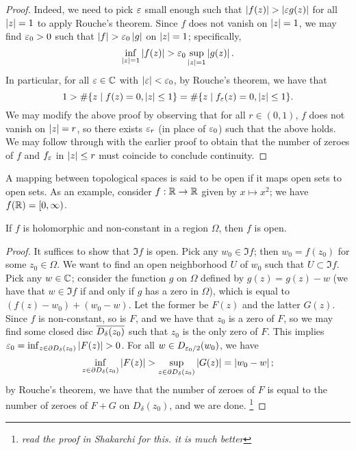 \begin{proof}
    Indeed, we need to pick $\varepsilon$ small enough such that $\left\lvert f(z) \right\rvert > \left\lvert \varepsilon g(z) \right\rvert$ for all $\left\lvert z \right\rvert = 1$ to apply Rouche's theorem. Since $f$ does not vanish on $\left\lvert z \right\rvert = 1$, we may find $\varepsilon_0 > 0$ such that $\left\lvert f \right\rvert > \varepsilon_0 \left\lvert g \right\rvert$ on $\left\lvert z \right\rvert = 1$; specifically,
    \[ \inf_{\left\lvert z \right\rvert = 1} \left\lvert f(z) \right\rvert > \varepsilon_0 \sup_{\left\lvert z \right\rvert = 1} \left\lvert g(z) \right\rvert. \]
    In particular, for all $\varepsilon \in \mathbb C$ with $\left\lvert \varepsilon \right\rvert < \varepsilon_0$, by Rouche's theorem, we have that 
    \[ 1 > \#\{z \mid f(z) = 0, \left\lvert z \right\rvert \leq 1\} = \#\{z \mid f_\varepsilon(z) = 0, \left\lvert z \right\rvert \leq 1\}. \]
    We may modify the above proof by observing that for all $r \in (0, 1)$, $f$ does not vanish on $\left\lvert z \right\rvert = r$, so there exists $\varepsilon_r$ (in place of $\varepsilon_0$) such that the above holds. We may follow through with the earlier proof to obtain that the number of zeroes of $f$ and $f_\varepsilon$ in $\left\lvert z \right\rvert \leq r$ must coincide to conclude continuity.
\end{proof}
\newpage
\noindent A mapping between topological spaces is said to be open if it maps open sets to open sets. As an example, consider $f : \mathbb R \to \mathbb R$ given by $x \mapsto x^2$; we have $f(\mathbb R) = [0, \infty)$.
\begin{theorem}
    If $f$ is holomorphic and non-constant in a region $\Omega$, then $f$ is open.
\end{theorem}
\begin{proof}
    It suffices to show that $\Im f$ is open. Pick any $w_0 \in \Im f$; then $w_0 = f(z_0)$ for some $z_0 \in \Omega$. We want to find an open neighborhood $U$ of $w_0$ such that $U \subset \Im f$. Pick any $w \in \mathbb C$; consider the function $g$ on $\Omega$ defined by $g(z) = g(z) - w$ (we have that $w \in \Im f$ if and only if $g$ has a zero in $\Omega$), which is equal to $(f(z) - w_0) + (w_0 - w)$. Let the former be $F(z)$ and the latter $G(z)$. Since $f$ is non-constant, so is $F$, and we have that $z_0$ is a zero of $F$, so we may find some closed disc $\overline{D_\delta(z_0)}$ such that $z_0$ is the only zero of $F$. This implies $\varepsilon_0 = \inf_{z \in \partial D_\delta (z_0)} \left\lvert F(z) \right\rvert > 0$. For all $w \in D_{\varepsilon_0/2} (w_0)$, we have
    \[ \inf_{z \in \partial D_\delta (z_0)} \left\lvert F(z) \right\rvert > \sup_{z \in \partial D_\delta(z_0)} \left\lvert G(z) \right\rvert = \left\lvert w_0 - w \right\rvert; \]
    by Rouche's theorem, we have that the number of zeroes of $F$ is equal to the number of zeroes of $F + G$ on $D_\delta(z_0)$, and we are done. \footnote{\textit{read the proof in Shakarchi for this. it is much better}}
\end{proof}
